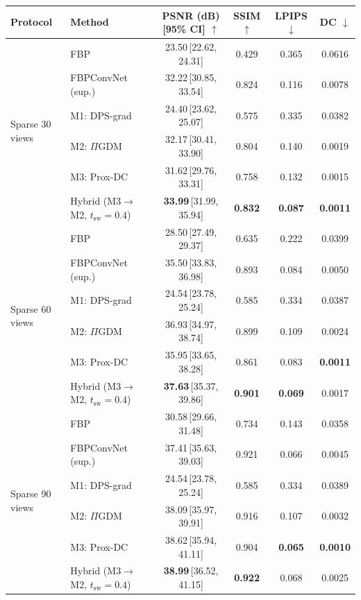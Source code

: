 \begin{tabular}{llcccc}
\toprule
Protocol & Method & PSNR (dB) [95\% CI] $\uparrow$ & SSIM $\uparrow$ & LPIPS $\downarrow$ & DC $\downarrow$ \\
\midrule
\multirow{6}{*}{Sparse 30 views}
 & FBP & 23.50\,{\scriptsize[22.62, 24.31]} & 0.429 & 0.365 & 0.0616 \\
 & FBPConvNet (sup.) & 32.22\,{\scriptsize[30.85, 33.54]} & 0.824 & 0.116 & 0.0078 \\
 & M1: DPS-grad & 24.40\,{\scriptsize[23.62, 25.07]} & 0.575 & 0.335 & 0.0382 \\
 & M2: $\Pi$GDM & 32.17\,{\scriptsize[30.41, 33.90]} & 0.804 & 0.140 & 0.0019 \\
 & M3: Prox-DC & 31.62\,{\scriptsize[29.76, 33.31]} & 0.758 & 0.132 & 0.0015 \\
 & Hybrid (M3$\to$M2, $t_{\mathrm{sw}}{=}0.4$) & \textbf{33.99}\,{\scriptsize[31.99, 35.94]} & \textbf{0.832} & \textbf{0.087} & \textbf{0.0011} \\
\midrule
\multirow{6}{*}{Sparse 60 views}
 & FBP & 28.50\,{\scriptsize[27.49, 29.37]} & 0.635 & 0.222 & 0.0399 \\
 & FBPConvNet (sup.) & 35.50\,{\scriptsize[33.83, 36.98]} & 0.893 & 0.084 & 0.0050 \\
 & M1: DPS-grad & 24.54\,{\scriptsize[23.78, 25.24]} & 0.585 & 0.334 & 0.0387 \\
 & M2: $\Pi$GDM & 36.93\,{\scriptsize[34.97, 38.74]} & 0.899 & 0.109 & 0.0024 \\
 & M3: Prox-DC & 35.95\,{\scriptsize[33.65, 38.28]} & 0.861 & 0.083 & \textbf{0.0011} \\
 & Hybrid (M3$\to$M2, $t_{\mathrm{sw}}{=}0.4$) & \textbf{37.63}\,{\scriptsize[35.37, 39.86]} & \textbf{0.901} & \textbf{0.069} & 0.0017 \\
\midrule
\multirow{6}{*}{Sparse 90 views}
 & FBP & 30.58\,{\scriptsize[29.66, 31.48]} & 0.734 & 0.143 & 0.0358 \\
 & FBPConvNet (sup.) & 37.41\,{\scriptsize[35.63, 39.03]} & 0.921 & 0.066 & 0.0045 \\
 & M1: DPS-grad & 24.54\,{\scriptsize[23.78, 25.24]} & 0.585 & 0.334 & 0.0389 \\
 & M2: $\Pi$GDM & 38.09\,{\scriptsize[35.97, 39.91]} & 0.916 & 0.107 & 0.0032 \\
 & M3: Prox-DC & 38.62\,{\scriptsize[35.94, 41.11]} & 0.904 & \textbf{0.065} & \textbf{0.0010} \\
 & Hybrid (M3$\to$M2, $t_{\mathrm{sw}}{=}0.4$) & \textbf{38.99}\,{\scriptsize[36.52, 41.15]} & \textbf{0.922} & 0.068 & 0.0025 \\

\end{tabular}
